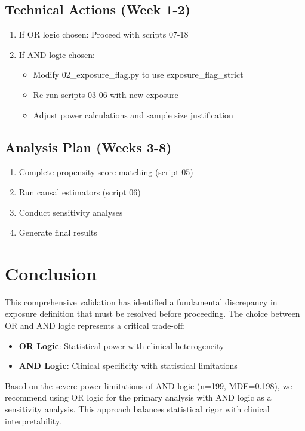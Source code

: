 \documentclass[11pt]{article}
\begin{document}
\subsection{Technical Actions (Week 1-2)}
\begin{enumerate}
    \item If OR logic chosen: Proceed with scripts 07-18
    \item If AND logic chosen: 
    \begin{itemize}
        \item Modify 02\_exposure\_flag.py to use exposure\_flag\_strict
        \item Re-run scripts 03-06 with new exposure
        \item Adjust power calculations and sample size justification
    \end{itemize}
\end{enumerate}

\subsection{Analysis Plan (Weeks 3-8)}
\begin{enumerate}
    \item Complete propensity score matching (script 05)
    \item Run causal estimators (script 06)
    \item Conduct sensitivity analyses
    \item Generate final results
\end{enumerate}

\section{Conclusion}

This comprehensive validation has identified a fundamental discrepancy in exposure definition that must be resolved before proceeding. The choice between OR and AND logic represents a critical trade-off:

\begin{itemize}
    \item \textbf{OR Logic}: Statistical power with clinical heterogeneity
    \item \textbf{AND Logic}: Clinical specificity with statistical limitations
\end{itemize}

Based on the severe power limitations of AND logic (n=199, MDE=0.198), we recommend using OR logic for the primary analysis with AND logic as a sensitivity analysis. This approach balances statistical rigor with clinical interpretability.
\end{document}
